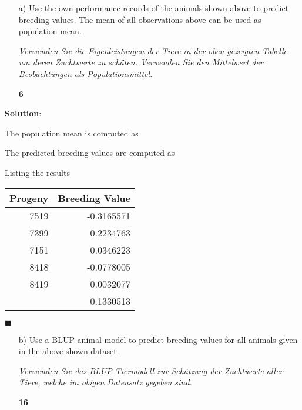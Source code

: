 \documentclass[
]{article}
\newenvironment{Shaded}{\begin{snugshade}}{\end{snugshade}}
\newcommand{\FunctionTok}[1]{\textcolor[rgb]{0.00,0.00,0.00}{#1}}
\newcommand{\NormalTok}[1]{#1}
\newcommand{\OtherTok}[1]{\textcolor[rgb]{0.56,0.35,0.01}{#1}}
\newcommand{\SpecialCharTok}[1]{\textcolor[rgb]{0.00,0.00,0.00}{#1}}
\newcommand{\points}[1]
{\begin{flushright}\textbf{#1}\end{flushright}}
\newcommand{\solstart}
{\vspace{3ex}\textbf{Solution}:}
\newcommand{\solend}
{\vspace{2ex}$\blacksquare$}
\begin{document}
\vspace{3ex}
\begin{enumerate}
\item[a)] Use the own performance records of the animals shown above to predict breeding values. The mean of all observations above can be used as population mean. 

\textit{Verwenden Sie die Eigenleistungen der Tiere in der oben gezeigten Tabelle um deren Zuchtwerte zu schäten. Verwenden Sie den Mittelwert der Beobachtungen als Populationsmittel.}
\points{6}
\end{enumerate}

\solstart

The population mean is computed as

\begin{Shaded}
\end{Shaded}

The predicted breeding values are computed as

\begin{Shaded}
\end{Shaded}

Listing the results

\begin{tabular}{rr}
\toprule
Progeny & Breeding Value\\
\midrule
7519 & -0.3165571\\
7399 & 0.2234763\\
7151 & 0.0346223\\
8418 & -0.0778005\\
8419 & 0.0032077\\
\addlinespace
8420 & 0.1330513\\
\bottomrule
\end{tabular}

\solend

\clearpage
\pagebreak

\begin{enumerate}
\item[b)] Use a BLUP animal model to predict breeding values for all animals given in the above shown dataset. 

\textit{Verwenden Sie das BLUP Tiermodell zur Schätzung der Zuchtwerte aller Tiere, welche im obigen Datensatz gegeben sind.}
\points{16}
\end{enumerate}
\end{document}
